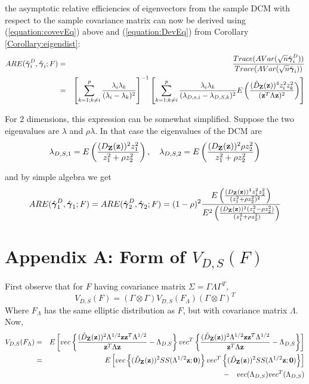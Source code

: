\documentclass[fleqn,12pt]{article}
\begin{document}
the asymptotic relative efficiencies of eigenvectors from the sample DCM with respect to the sample covariance matrix can now be derived using (\ref{equation:covevEq}) above and (\ref{equation:DevEq}) from Corollary \ref{Corollary:eigendist}:
\begin{eqnarray*}
ARE(\hat{{\boldsymbol{\gamma}}}^D_i, \hat{{\boldsymbol{\gamma}}}_i; F) &=& \frac{Trace( AVar(\sqrt n\hat {{\boldsymbol{\gamma}}}^D_i))}{Trace( AVar(\sqrt n\hat {{\boldsymbol{\gamma}}}_i))}\\
&=& \left[\sum_{k=1; k \neq i}^p \frac{\lambda_i \lambda_k}{(\lambda_i - \lambda_k)^2} \right]^{-1} \left[ \sum_{k=1; k \neq i}^p \frac{\lambda_i \lambda_k }{(\lambda_{D,s,i} - \lambda_{D,S,k})^2} E \left( \frac{(\tilde D_{\mathbf{Z}} ({\bf{z}}))^4 z_i^2 z_k^2}{({\bf{z}}^T \Lambda {\bf{z}})^2} \right) \right]
\end{eqnarray*}

For 2 dimensions, this expression can be somewhat simplified. Suppose the two eigenvalues are $\lambda$ and $\rho\lambda$. In that case the eigenvalues of the DCM are
$$ \lambda_{D,S,1} = E \left( \frac{(D_{\mathbf{Z}}({\bf{z}}))^2 z_1^2}{z_1^2 + \rho z_2^2} \right), \quad
\lambda_{D,S,2} = E \left( \frac{(D_{\mathbf{Z}}({\bf{z}}))^2 \rho z_2^2}{z_1^2 + \rho z_2^2} \right) $$

and by simple algebra we get
$$ ARE(\hat{{\boldsymbol{\gamma}}}^D_1, \hat{{\boldsymbol{\gamma}}}_1; F) = ARE(\hat{{\boldsymbol{\gamma}}}^D_2, \hat{{\boldsymbol{\gamma}}}_2; F) = (1-\rho)^2 \frac{E \left( \frac{(D_{\mathbf{Z}}({\bf{z}}))^4 z_1^2z_2^2}{(z_1^2 + \rho z_2^2)^2}\right)}{E^2 \left( \frac{(D_{\mathbf{Z}}({\bf{z}}))^2 (z_1^2 - \rho z_2^2)}{(z_1^2 + \rho z_2^2)} \right)} $$

\section*{Appendix A: \textbf{Form of $V_{D,S}(F)$}}
First observe that for $F$ having covariance matrix $\Sigma = \Gamma\Lambda\Gamma^T$,
$$ V_{D,S}(F)  = (\Gamma \otimes \Gamma) V_{D,S}(F_\Lambda) (\Gamma \otimes \Gamma)^T$$
Where $F_\Lambda$ has the same elliptic distribution as $F$, but with covariance matrix $\Lambda$. Now,
\begin{eqnarray*}
V_{D,S} (F_\Lambda) &=& E \left[ vec \left\{ \frac{(\tilde D_{\mathbf{Z}} ({\bf{z}}))^2 \Lambda^{1/2} {\bf{z}}{\bf{z}}^T \Lambda^{1/2}}{{\bf{z}}^T\Lambda{\bf{z}}} - \Lambda_{D,S} \right\} vec^T \left\{ \frac{(\tilde D_{\mathbf{Z}} ({\bf{z}}))^2 \Lambda^{1/2} {\bf{z}}{\bf{z}}^T \Lambda^{1/2}}{{\bf{z}}^T\Lambda{\bf{z}}} - \Lambda_{D,S} \right\} \right]\\
&=& E \left[ vec \left\{ (\tilde D_{\mathbf{Z}} ({\bf{z}}))^2 SS(\Lambda^{1/2}{\bf{z}}; \bf0) \right\} vec^T \left\{ (\tilde D_{\mathbf{Z}} ({\bf{z}}))^2 SS(\Lambda^{1/2}{\bf{z}}; \bf0) \right\} \right]\\
&& - \quad vec(\Lambda_{D,S}) vec^T(\Lambda_{D,S})
\end{eqnarray*}
\end{document}
